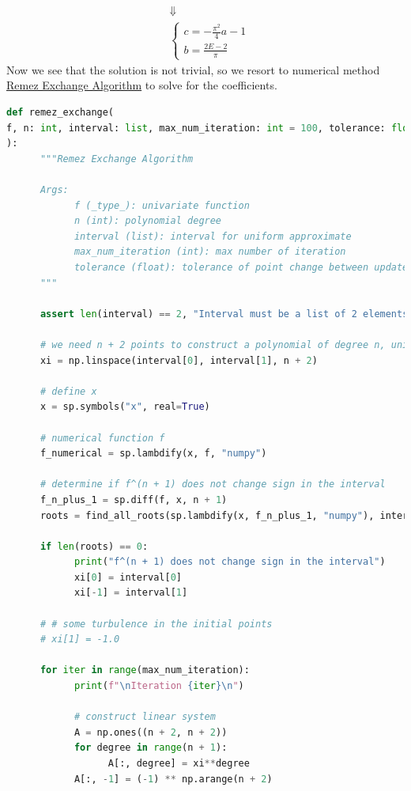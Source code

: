 \documentclass[conference,onecolumn]{IEEEtran}
\begin{document}
\begin{enumerate}[label=\arabic{enumi}.]
\begin{enumerate}
\begin{align*}
                               & \Downarrow                \\
                               & \begin{cases}
                                    c = -\frac{\pi^2}{4}a - 1 \\
                                    b = \frac{2E - 2}{\pi}
                              \end{cases}
                        \end{align*}
                        Now we see that the solution is not trivial, so we resort to numerical method \href{https://youtu.be/j29rVHCpRUY?si=eV1INsW6upgQ4lG5}{Remez Exchange Algorithm} to solve for the coefficients.
                        \begin{lstlisting}[language=Python]
def remez_exchange(
f, n: int, interval: list, max_num_iteration: int = 100, tolerance: float = 1e-5
):
      """Remez Exchange Algorithm

      Args:
            f (_type_): univariate function
            n (int): polynomial degree
            interval (list): interval for uniform approximate
            max_num_iteration (int): max number of iteration
            tolerance (float): tolerance of point change between updates
      """

      assert len(interval) == 2, "Interval must be a list of 2 elements"

      # we need n + 2 points to construct a polynomial of degree n, uniform initialization
      xi = np.linspace(interval[0], interval[1], n + 2)

      # define x
      x = sp.symbols("x", real=True)

      # numerical function f
      f_numerical = sp.lambdify(x, f, "numpy")

      # determine if f^(n + 1) does not change sign in the interval
      f_n_plus_1 = sp.diff(f, x, n + 1)
      roots = find_all_roots(sp.lambdify(x, f_n_plus_1, "numpy"), interval)

      if len(roots) == 0:
            print("f^(n + 1) does not change sign in the interval")
            xi[0] = interval[0]
            xi[-1] = interval[1]

      # # some turbulence in the initial points
      # xi[1] = -1.0

      for iter in range(max_num_iteration):
            print(f"\nIteration {iter}\n")

            # construct linear system
            A = np.ones((n + 2, n + 2))
            for degree in range(n + 1):
                  A[:, degree] = xi**degree
            A[:, -1] = (-1) ** np.arange(n + 2)


\end{lstlisting}
\end{enumerate}
\end{enumerate}
\end{document}
